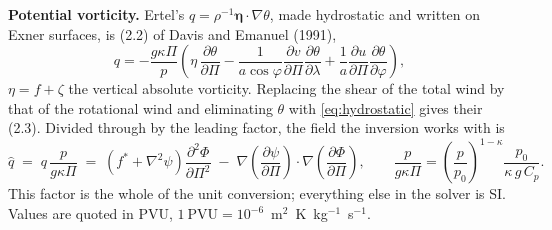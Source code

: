 \documentclass[11pt,a4paper]{article}
\newcommand{\dd}[2]{\frac{\partial #1}{\partial #2}}
\newcommand{\ddd}[2]{\frac{\partial^2 #1}{\partial #2^2}}
\newcommand{\lap}{\nabla^2}
\newcommand{\grad}{\nabla}
\begin{document}
\textbf{Potential vorticity.} Ertel's $q=\rho^{-1}\boldsymbol{\eta}\cdot\grad\theta$,
made hydrostatic and written on Exner surfaces, is (2.2) of Davis and Emanuel
(1991),
\begin{equation}
q = -\frac{g\kappa\Pi}{p}
\left(
\eta\,\dd{\theta}{\Pi}
- \frac{1}{a\cos\varphi}\dd{v}{\Pi}\dd{\theta}{\lambda}
+ \frac{1}{a}\dd{u}{\Pi}\dd{\theta}{\varphi}
\right),
\label{eq:pvhydro}
\end{equation}
$\eta=f+\zeta$ the vertical absolute vorticity. Replacing the shear of the
total wind by that of the rotational wind and eliminating $\theta$ with
\eqref{eq:hydrostatic} gives their (2.3). Divided through by the leading
factor, the field the inversion works with is
\begin{equation}
\hat q \;=\; q\,\frac{p}{g\kappa\Pi}
\;=\; \left(f^{*}+\lap\psi\right)\ddd{\Phi}{\Pi}
 \;-\; \grad\!\left(\dd{\psi}{\Pi}\right)\cdot\grad\!\left(\dd{\Phi}{\Pi}\right),
\qquad
\frac{p}{g\kappa\Pi} = \left(\frac{p}{p_0}\right)^{1-\kappa}\frac{p_0}{\kappa\,g\,C_p}.
\label{eq:pvsolved}
\end{equation}
This factor is the whole of the unit conversion; everything else in the solver
is SI. Values are quoted in PVU, $1~\text{PVU}=10^{-6}$~m$^2$~K~kg$^{-1}$~s$^{-1}$.
\end{document}
